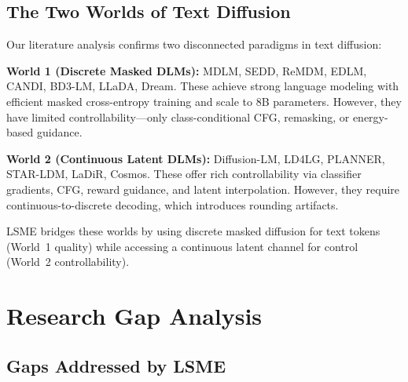 \documentclass{article}
\begin{document}
\subsection{The Two Worlds of Text Diffusion}

Our literature analysis confirms two disconnected paradigms in text diffusion:

\textbf{World 1 (Discrete Masked DLMs):} MDLM, SEDD, ReMDM, EDLM, CANDI, BD3-LM, LLaDA, Dream. These achieve strong language modeling with efficient masked cross-entropy training and scale to 8B parameters. However, they have limited controllability---only class-conditional CFG, remasking, or energy-based guidance.

\textbf{World 2 (Continuous Latent DLMs):} Diffusion-LM, LD4LG, PLANNER, STAR-LDM, LaDiR, Cosmos. These offer rich controllability via classifier gradients, CFG, reward guidance, and latent interpolation. However, they require continuous-to-discrete decoding, which introduces rounding artifacts.

LSME bridges these worlds by using discrete masked diffusion for text tokens (World~1 quality) while accessing a continuous latent channel for control (World~2 controllability).

\section{Research Gap Analysis}
\label{app:gaps_detailed}

\subsection{Gaps Addressed by LSME}
\end{document}
